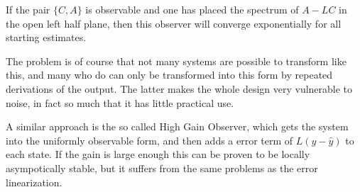 If the pair $\{C,A\}$ is observable and one has placed the spectrum of $A-LC$ in the open left half plane, then this observer will converge exponentially for all starting estimates. 

The problem is of course that not many systems are possible to transform like this, and many who do can only be transformed into this form by repeated derivations of the output. The latter makes the whole design very vulnerable to noise, in fact so much that it has little practical use. 


A similar approach is the so called High Gain Observer\cite{HighGain}, which gets the system into the uniformly observable form, and then adds a error term of $L(y-\hat{y})$ to each state. If the gain is large enough this can be proven to be locally asympotically stable, but it suffers from the same problems as the error linearization. 
